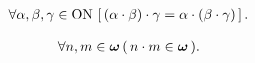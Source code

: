 	\begin{screen}
		\begin{thm}[乗法は結合的]
			\begin{align}
				\forall \alpha,\beta,\gamma \in \mathrm{ON}\, 
				\left[\, (\alpha \cdot \beta) \cdot \gamma = \alpha \cdot (\beta \cdot \gamma)\, \right].
			\end{align}
		\end{thm}
	\end{screen}
	
	\begin{screen}
		\begin{thm}[自然数の積は自然数]\label{thm:product_of_natural_numbers_is_a_natural_number}
			\begin{align}
				\forall n, m \in {\boldsymbol \omega}\, (\, n \cdot m \in {\boldsymbol \omega}\, ).
			\end{align}
		\end{thm}
	\end{screen}